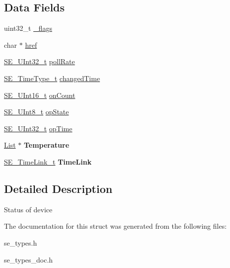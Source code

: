 \subsection*{Data Fields}
\begin{DoxyCompactItemize}
\item 
uint32\+\_\+t \hyperlink{group__DeviceStatus_gaaf6c4544a5c3d62732dc559d43634149}{\+\_\+flags}
\item 
char $\ast$ \hyperlink{group__DeviceStatus_gac832af3c5e30f58a11ec61588798c6ea}{href}
\item 
\hyperlink{group__UInt32_ga70bd4ecda3c0c85d20779d685a270cdb}{S\+E\+\_\+\+U\+Int32\+\_\+t} \hyperlink{group__DeviceStatus_ga128ee35b8323aa8aa753b754fd502ec8}{poll\+Rate}
\item 
\hyperlink{group__TimeType_ga6fba87a5b57829b4ff3f0e7638156682}{S\+E\+\_\+\+Time\+Type\+\_\+t} \hyperlink{group__DeviceStatus_ga01b3f945cf198175ee85e8c068825f6e}{changed\+Time}
\item 
\hyperlink{group__UInt16_gac68d541f189538bfd30cfaa712d20d29}{S\+E\+\_\+\+U\+Int16\+\_\+t} \hyperlink{group__DeviceStatus_ga88599e2bbaa35b2fc2f340a24f873b13}{on\+Count}
\item 
\hyperlink{group__UInt8_gaf7c365a1acfe204e3a67c16ed44572f5}{S\+E\+\_\+\+U\+Int8\+\_\+t} \hyperlink{group__DeviceStatus_ga298a44d2837e5f528c9f81ec73c69fc7}{op\+State}
\item 
\hyperlink{group__UInt32_ga70bd4ecda3c0c85d20779d685a270cdb}{S\+E\+\_\+\+U\+Int32\+\_\+t} \hyperlink{group__DeviceStatus_ga6c24575c59f3ab054c989011e29e5d5d}{op\+Time}
\item 
\hyperlink{structList}{List} $\ast$ {\bfseries Temperature}
\item 
\hyperlink{structSE__TimeLink__t}{S\+E\+\_\+\+Time\+Link\+\_\+t} {\bfseries Time\+Link}
\end{DoxyCompactItemize}


\subsection{Detailed Description}
Status of device 

The documentation for this struct was generated from the following files\+:\begin{DoxyCompactItemize}
\item 
se\+\_\+types.\+h\item 
se\+\_\+types\+\_\+doc.\+h\end{DoxyCompactItemize}
